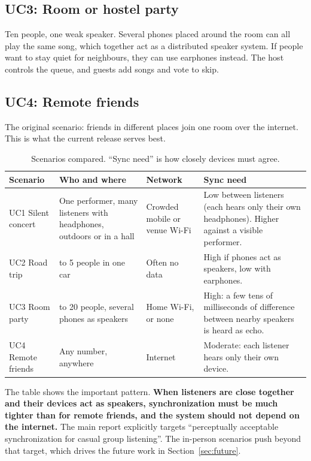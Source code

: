 \documentclass[11pt,a4paper]{article}
\begin{document}
\subsection{UC3: Room or hostel party}
Ten people, one weak speaker. Several phones placed around the room can all play the same
song, which together act as a distributed speaker system. If people want to stay quiet for
neighbours, they can use earphones instead. The host controls the queue, and guests add
songs and vote to skip.

\subsection{UC4: Remote friends}
The original scenario: friends in different places join one room over the internet. This
is what the current release serves best.

\begin{table}[htbp]
\centering
\caption{Scenarios compared. ``Sync need'' is how closely devices must agree.}
\label{tab:scenarios}
\footnotesize
\begin{tabularx}{\textwidth}{@{}l>{\raggedright\arraybackslash}X>{\raggedright\arraybackslash}X>{\raggedright\arraybackslash}X@{}}
\toprule
\textbf{Scenario} & \textbf{Who and where} & \textbf{Network} & \textbf{Sync need} \\
\midrule
UC1 Silent concert & One performer, many listeners with headphones, outdoors or in a hall
  & Crowded mobile or venue Wi-Fi
  & Low between listeners (each hears only their own headphones). Higher against a visible performer. \\
UC2 Road trip & 2 to 5 people in one car
  & Often no data
  & High if phones act as speakers, low with earphones. \\
UC3 Room party & 5 to 20 people, several phones as speakers
  & Home Wi-Fi, or none
  & High: a few tens of milliseconds of difference between nearby speakers is heard as echo. \\
UC4 Remote friends & Any number, anywhere
  & Internet
  & Moderate: each listener hears only their own device. \\
\bottomrule
\end{tabularx}
\end{table}

The table shows the important pattern. \textbf{When listeners are close together and their
devices act as speakers, synchronization must be much tighter than for remote friends,
and the system should not depend on the internet.} The main report explicitly targets
``perceptually acceptable synchronization for casual group listening''. The in-person
scenarios push beyond that target, which drives the future work in Section~\ref{sec:future}.
\end{document}
